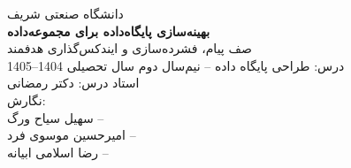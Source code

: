 \documentclass[a4paper,12pt]{article}
\author{}
\date{}
\begin{document}
\begin{titlepage}
\centering
\vspace*{1.5cm}
{\Large دانشگاه صنعتی شریف}\\[2cm]

{\huge\bfseries بهینه‌سازی پایگاه‌داده  برای مجموعه‌داده }\\[0.5cm]
{\Large صف پیام، فشرده‌سازی  و ایندکس‌گذاری هدفمند}\\[2.5cm]

{\large درس: طراحی پایگاه داده -- نیم‌سال دوم سال تحصیلی 1404--1405}\\[0.3cm]
{\large استاد درس: دکتر رمضانی}\\[2cm]

{\large نگارش:}\\[0.4cm]
{\large سهیل سیاح ورگ -- }\\[0.2cm]
{\large امیرحسین موسوی فرد -- }\\[0.2cm]
{\large رضا اسلامی ابیانه -- }\\[1cm]

\vfill
\end{titlepage}



\tableofcontents
\newpage








\end{document}
